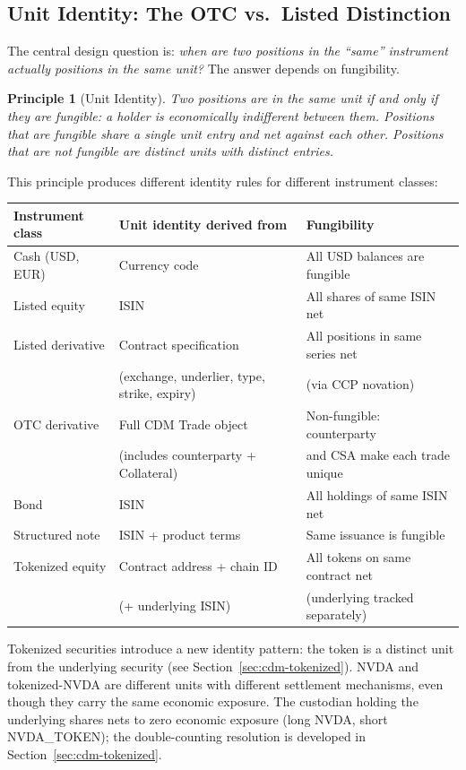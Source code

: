 \documentclass[11pt,a4paper]{article}
\newtheorem{principle}[definition]{Principle}
\begin{document}
\subsection{Unit Identity: The OTC vs.\ Listed Distinction}
\label{sec:unit-identity}

The central design question is: \emph{when are two positions in the ``same'' instrument actually positions in the same unit?} The answer depends on fungibility.

\begin{principle}[Unit Identity]
Two positions are in the same unit if and only if they are fungible: a holder is economically indifferent between them. Positions that are fungible share a single unit entry and net against each other. Positions that are not fungible are distinct units with distinct entries.
\end{principle}

This principle produces different identity rules for different instrument classes:

\begin{center}
\small
\begin{tabular}{l l l}
\toprule
\textbf{Instrument class} & \textbf{Unit identity derived from} & \textbf{Fungibility} \\
\midrule
Cash (USD, EUR) & Currency code & All USD balances are fungible \\
Listed equity & ISIN & All shares of same ISIN net \\
Listed derivative & Contract specification & All positions in same series net \\
 & (exchange, underlier, type, strike, expiry) & (via CCP novation) \\
OTC derivative & Full CDM Trade object & Non-fungible: counterparty \\
 & (includes counterparty + Collateral) & and CSA make each trade unique \\
Bond & ISIN & All holdings of same ISIN net \\
Structured note & ISIN + product terms & Same issuance is fungible \\
Tokenized equity & Contract address + chain ID & All tokens on same contract net \\
 & (+ underlying ISIN) & (underlying tracked separately) \\
\bottomrule
\end{tabular}
\end{center}

\noindent Tokenized securities introduce a new identity pattern: the token is a distinct unit from the underlying security (see Section~\ref{sec:cdm-tokenized}). NVDA and tokenized-NVDA are different units with different settlement mechanisms, even though they carry the same economic exposure. The custodian holding the underlying shares nets to zero economic exposure (long NVDA, short NVDA\_TOKEN); the double-counting resolution is developed in Section~\ref{sec:cdm-tokenized}.
\end{document}
